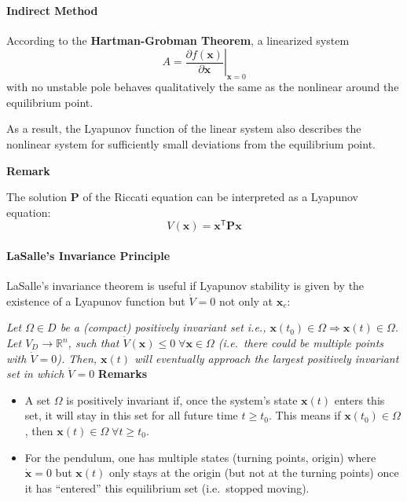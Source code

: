 \paragraph{Indirect Method}
According to the \textbf{Hartman-Grobman Theorem}, a linearized system
\noindent\begin{equation*}
    A = \left.\frac{\partial f(\mathbf{x})}{\partial \mathbf{x}} \right|_{\mathbf{x} = 0}
\end{equation*} with no unstable pole behaves qualitatively the same as the nonlinear around the equilibrium point.

\newpar{}
As a result, the Lyapunov function of the linear system also describes the nonlinear system for sufficiently small deviations from the equilibrium point.

\newpar{}
\textbf{Remark}

The solution $\mathbf{P}$ of the Riccati equation can be interpreted as a Lyapunov equation:
\noindent\begin{equation*}
    V(\mathbf{x}) = \mathbf{x}^{\mathsf{T}} \mathbf{Px}
\end{equation*}

\paragraph{LaSalle's Invariance Principle}
LaSalle's invariance theorem is useful if Lyapunov stability is given by the existence of a Lyapunov function but $\dot{V}=0$ not only at $\mathbf{x}_e$:

\newpar{}
\textit{Let $\Omega\in D$ be a (compact) positively invariant set i.e., $\mathbf{x}(t_0)\in \Omega \Rightarrow \mathbf{x}(t)\in\Omega$.
    Let $V_D\to \mathbb{R}^n$, such that $\dot{V}(\mathbf{x})\leq 0\; \forall \mathbf{x}\in \Omega$ (i.e.\ there could be multiple points with $\dot{V}=0$).
    Then, $\mathbf{x}(t)$ will eventually approach the largest positively invariant set in which $\dot{V}=0$
}
\newpar{}
\textbf{Remarks}
\begin{itemize}
    \item A set $\Omega$ is positively invariant if, once the system's state $\mathbf{x}(t)$ enters this set, it will stay in this set for all future time $t \geq t_0$. This means if $\mathbf{x}(t_0) \in \Omega$, then $\mathbf{x}(t) \in \Omega\; \forall t \geq t_0$.
    \item For the pendulum, one has multiple states (turning points, origin) where $\dot{\mathbf{x}}=0$ but $\mathbf{x}(t)$ only stays at the origin (but not at the turning points) once it has ``entered'' this equilibrium set (i.e.\ stopped moving).
\end{itemize}

